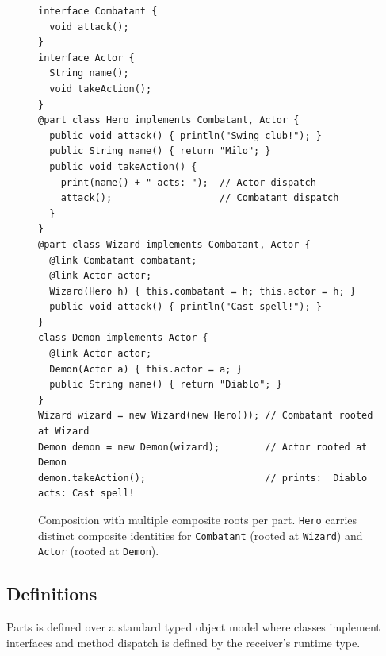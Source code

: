 \documentclass[acmsmall,nonacm]{acmart}
\theoremstyle{acmplain}
\newcommand{\code}[1]{\texttt{#1}}
\begin{document}
\begin{figure}[H]
\begin{lstlisting}
interface Combatant {
  void attack();
}
interface Actor {
  String name();
  void takeAction();
}
@part class Hero implements Combatant, Actor {
  public void attack() { println("Swing club!"); }
  public String name() { return "Milo"; }
  public void takeAction() {
    print(name() + " acts: ");  // Actor dispatch
    attack();                   // Combatant dispatch
  }
}
@part class Wizard implements Combatant, Actor {
  @link Combatant combatant;
  @link Actor actor;
  Wizard(Hero h) { this.combatant = h; this.actor = h; }
  public void attack() { println("Cast spell!"); }
}
class Demon implements Actor {
  @link Actor actor;
  Demon(Actor a) { this.actor = a; }
  public String name() { return "Diablo"; }
}
Wizard wizard = new Wizard(new Hero()); // Combatant rooted at Wizard
Demon demon = new Demon(wizard);        // Actor rooted at Demon
demon.takeAction();                     // prints:  Diablo acts: Cast spell!
\end{lstlisting}
\caption{Composition with multiple composite roots per part.
\code{Hero} carries distinct composite identities for \code{Combatant}
(rooted at \code{Wizard}) and \code{Actor} (rooted at \code{Demon}).}
\label{fig:dag-listing}
\end{figure}

\subsection{Definitions}

Parts is defined over a standard typed object model where classes implement interfaces and method dispatch is defined by
the receiver's runtime type.
\end{document}
